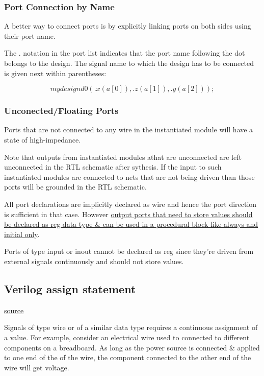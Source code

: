 \documentclass{article}
\begin{document}
	\subsubsection{Port Connection by Name}

	A better way to connect ports is by explicitly linking ports on both sides using their port name.

	The . notation in the port list indicates that the port name following the dot belongs to the design. The signal name to which the design has to be connected is given next within parentheses:

	\[ mydesign d0 ( .x (a[0]), .z(a[1]), .y (a[2]) ); \]

	\subsubsection{Unconected/Floating Ports}

	Ports that are not connected to any wire in the instantiated module will have a state of high-impedance.

	Note that outputs from instantiated modules athat are unconnected are left unconnected in the RTL schematic after sythesis. If the input to such instantiated modules are connected to nets that
	are not being driven than those ports will be grounded in the RTL schematic. \newline

	All port declarations are implicitly declared as wire and hence the port direction is sufficient in that case. However \underline{output ports that need to store values should be declared as reg 
	data type \& can be used in a procedural block like always and initial only}. \newline

	Ports of type input or inout cannot be declared as reg since they're driven from external signals continuously and should not store values. 

	\subsection{Verilog assign statement}

	\href{https://www.chipverify.com/verilog/verilog-assign-statement}{source}

	Signals of type wire or of a similar data type requires a continuous assignment of a value. For example, consider an electrical wire used to connected to different components on a breadboard. As
	long as the power source is connected \& applied to one end of the of the wire, the component connected to the other end of the wire will get voltage. \newline
\end{document}
